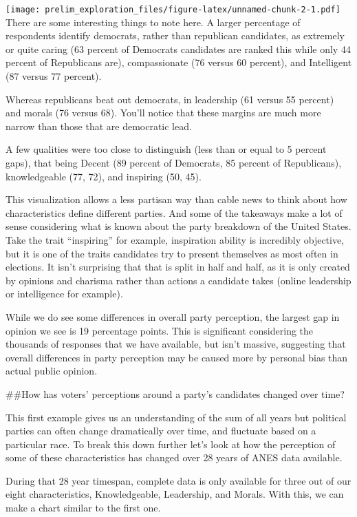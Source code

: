 \documentclass[
]{article}
\begin{document}
\texttt{[image: prelim\_exploration\_files/figure-latex/unnamed-chunk-2-1.pdf]}
There are some interesting things to note here. A larger percentage of
respondents identify democrats, rather than republican candidates, as
extremely or quite caring (63 percent of Democrats candidates are ranked
this while only 44 percent of Republicans are), compassionate (76 versus
60 percent), and Intelligent (87 versus 77 percent).

Whereas republicans beat out democrats, in leadership (61 versus 55
percent) and morals (76 versus 68). You'll notice that these margins are
much more narrow than those that are democratic lead.

A few qualities were too close to distinguish (less than or equal to 5
percent gaps), that being Decent (89 percent of Democrats, 85 percent of
Republicans), knowledgeable (77, 72), and inspiring (50, 45).

This visualization allows a less partisan way than cable news to think
about how characteristics define different parties. And some of the
takeaways make a lot of sense considering what is known about the party
breakdown of the United States. Take the trait ``inspiring'' for
example, inspiration ability is incredibly objective, but it is one of
the traits candidates try to present themselves as most often in
elections. It isn't surprising that that is split in half and half, as
it is only created by opinions and charisma rather than actions a
candidate takes (online leadership or intelligence for example).

While we do see some differences in overall party perception, the
largest gap in opinion we see is 19 percentage points. This is
significant considering the thousands of responses that we have
available, but isn't massive, suggesting that overall differences in
party perception may be caused more by personal bias than actual public
opinion.

\#\#How has voters' perceptions around a party's candidates changed over
time?

This first example gives us an understanding of the sum of all years but
political parties can often change dramatically over time, and fluctuate
based on a particular race. To break this down further let's look at how
the perception of some of these characteristics has changed over 28
years of ANES data available.

During that 28 year timespan, complete data is only available for three
out of our eight characteristics, Knowledgeable, Leadership, and Morals.
With this, we can make a chart similar to the first one.
\end{document}
